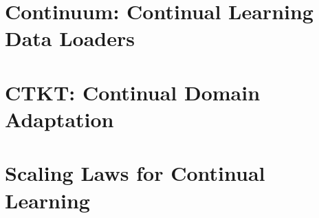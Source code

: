 \section{Continuum: Continual Learning Data Loaders}

\section{CTKT: Continual Domain Adaptation}

\section{Scaling Laws for Continual Learning}


